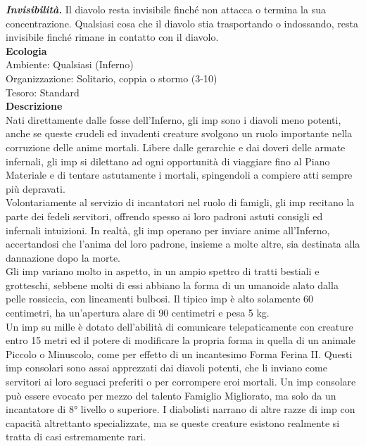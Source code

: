 \begin{multicols}{2}
\emph{\textbf{Invisibilità.}} Il diavolo resta invisibile finché non attacca o termina la sua concentrazione. Qualsiasi cosa che il diavolo stia trasportando o indossando, resta invisibile finché rimane in contatto con il diavolo.\\
\textbf{Ecologia}\\
Ambiente: Qualsiasi (Inferno)\\
Organizzazione: Solitario, coppia o stormo (3-10)\\
Tesoro: Standard\\
\textbf{Descrizione}\\
Nati direttamente dalle fosse dell’Inferno, gli imp sono i diavoli meno potenti, anche se queste crudeli ed invadenti creature svolgono un ruolo importante nella corruzione delle anime mortali. Libere dalle gerarchie e dai doveri delle armate infernali, gli imp si dilettano ad ogni opportunità di viaggiare fino al Piano Materiale e di tentare astutamente i mortali, spingendoli a compiere atti sempre più depravati.\\

Volontariamente al servizio di incantatori nel ruolo di famigli, gli imp recitano la parte dei fedeli servitori, offrendo spesso ai loro padroni astuti consigli ed infernali intuizioni. In realtà, gli imp operano per inviare anime all’Inferno, accertandosi che l’anima del loro padrone, insieme a molte altre, sia destinata alla dannazione dopo la morte.\\

Gli imp variano molto in aspetto, in un ampio spettro di tratti bestiali e grotteschi, sebbene molti di essi abbiano la forma di un umanoide alato dalla pelle rossiccia, con lineamenti bulbosi. Il tipico imp è alto solamente 60 centimetri, ha un’apertura alare di 90 centimetri e pesa 5 kg.\\

Un imp su mille è dotato dell’abilità di comunicare telepaticamente con creature entro 15 metri ed il potere di modificare la propria forma in quella di un animale Piccolo o Minuscolo, come per effetto di un incantesimo Forma Ferina II. Questi imp consolari sono assai apprezzati dai diavoli potenti, che li inviano come servitori ai loro seguaci preferiti o per corrompere eroi mortali. Un imp consolare può essere evocato per mezzo del talento Famiglio Migliorato, ma solo da un incantatore di 8° livello o superiore. I diabolisti narrano di altre razze di imp con capacità altrettanto specializzate, ma se queste creature esistono realmente si tratta di casi estremamente rari.\\


\end{multicols}

